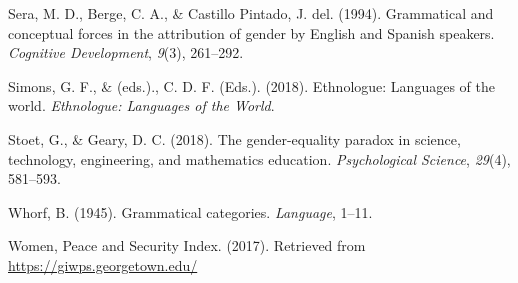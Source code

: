 \documentclass[man,floatsintext]{apa6}
\theoremstyle{definition}
\theoremstyle{definition}
\theoremstyle{definition}
\theoremstyle{remark}
\begin{document}
\hypertarget{ref-sera1994grammatical}{}
Sera, M. D., Berge, C. A., \& Castillo Pintado, J. del. (1994).
Grammatical and conceptual forces in the attribution of gender by
English and Spanish speakers. \emph{Cognitive Development}, \emph{9}(3),
261--292.

\hypertarget{ref-simons2018}{}
Simons, G. F., \& (eds.)., C. D. F. (Eds.). (2018). Ethnologue:
Languages of the world. \emph{Ethnologue: Languages of the World}.

\hypertarget{ref-stoet2018gender}{}
Stoet, G., \& Geary, D. C. (2018). The gender-equality paradox in
science, technology, engineering, and mathematics education.
\emph{Psychological Science}, \emph{29}(4), 581--593.

\hypertarget{ref-whorf1945grammatical}{}
Whorf, B. (1945). Grammatical categories. \emph{Language}, 1--11.

\hypertarget{ref-wps}{}
Women, Peace and Security Index. (2017). Retrieved from
\url{https://giwps.georgetown.edu/}

\endgroup
\end{document}
